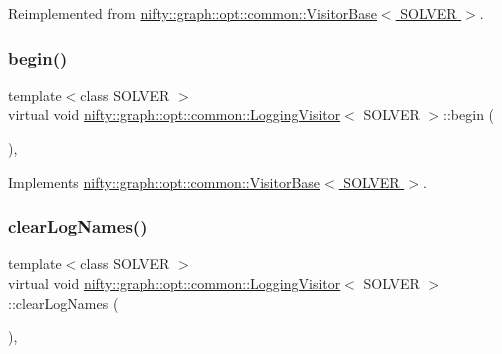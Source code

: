 Reimplemented from \hyperlink{classnifty_1_1graph_1_1opt_1_1common_1_1VisitorBase_acc4f1b419303965b0313ca83c6a7a420}{nifty\+::graph\+::opt\+::common\+::\+Visitor\+Base$<$ S\+O\+L\+V\+E\+R $>$}.

\mbox{\label{classnifty_1_1graph_1_1opt_1_1common_1_1LoggingVisitor_a5ab79ee5e4afe5e7af570c64b1678dbc}} 
\subsubsection{\texorpdfstring{begin()}{begin()}}
{\footnotesize\ttfamily template$<$class S\+O\+L\+V\+ER $>$ \\
virtual void \hyperlink{classnifty_1_1graph_1_1opt_1_1common_1_1LoggingVisitor}{nifty\+::graph\+::opt\+::common\+::\+Logging\+Visitor}$<$ S\+O\+L\+V\+ER $>$\+::begin (\begin{DoxyParamCaption}\item[{\hyperlink{classnifty_1_1graph_1_1opt_1_1common_1_1LoggingVisitor_af6aa5fbf9acd4c1fa02fa34c73b90c1b}{Solver\+Type} $\ast$}]{ }\end{DoxyParamCaption})\hspace{0.3cm}{\ttfamily [inline]}, {\ttfamily [virtual]}}



Implements \hyperlink{classnifty_1_1graph_1_1opt_1_1common_1_1VisitorBase_a8c4462a0cd838b0082f7157ad4b2d770}{nifty\+::graph\+::opt\+::common\+::\+Visitor\+Base$<$ S\+O\+L\+V\+E\+R $>$}.

\mbox{\label{classnifty_1_1graph_1_1opt_1_1common_1_1LoggingVisitor_a84dd33facd4e7b509e5d311f2e94df1a}} 
\subsubsection{\texorpdfstring{clear\+Log\+Names()}{clearLogNames()}}
{\footnotesize\ttfamily template$<$class S\+O\+L\+V\+ER $>$ \\
virtual void \hyperlink{classnifty_1_1graph_1_1opt_1_1common_1_1LoggingVisitor}{nifty\+::graph\+::opt\+::common\+::\+Logging\+Visitor}$<$ S\+O\+L\+V\+ER $>$\+::clear\+Log\+Names (\begin{DoxyParamCaption}{ }\end{DoxyParamCaption})\hspace{0.3cm}{\ttfamily [inline]}, {\ttfamily [virtual]}}



